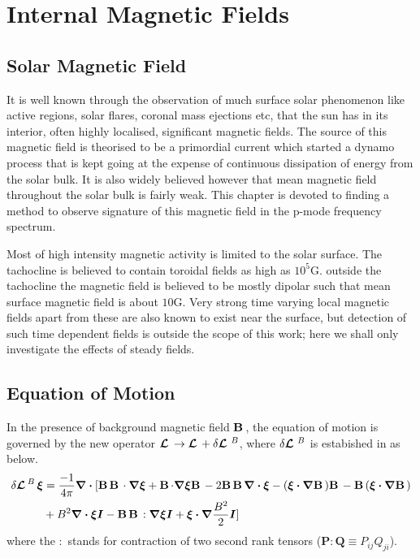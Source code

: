 \chapter{Internal Magnetic Fields}

\section{Solar Magnetic Field}\label{mag_intro}

It is well known through the observation of much surface solar phenomenon like active regions, solar flares, coronal mass ejections etc, that the sun has in its interior, often highly localised, significant magnetic fields. The source of this magnetic field is theorised to be a primordial current which started a dynamo process that is kept going at the expense of continuous dissipation of energy from the solar bulk. It is also widely believed however that mean magnetic field throughout the solar bulk is fairly weak. This chapter is devoted to finding a method to observe signature of this magnetic field in the p-mode frequency spectrum.

Most of high intensity magnetic activity is limited to the solar surface. The tachocline is believed to contain toroidal fields as high as $10^5 \text{G}$. outside the tachocline the magnetic field is believed to be mostly dipolar such that mean surface magnetic field is about $10\text{G}$. Very strong time varying local magnetic fields apart from these are also known to exist near the surface, but detection of such time dependent fields is outside the scope of this work; here we shall only investigate the effects of steady fields.

\section{Equation of Motion}

In the presence of background magnetic field $\mathbf{B}\,$, the equation of motion is governed by the new operator $\bm{\mathcal{L}}\, \rightarrow \bm{\mathcal{L}}\, + \delta \bm{\mathcal{L}}\,\,^{B}$, where $\delta \bm{\mathcal{L}}\,\,^B$ is estabished in \cite{hanasoge17} as below.
\begin{align}
    \delta \bm{\mathcal{L}}\,^{B}\, \boldsymbol{\xi} &= \frac{-1}{4\pi}\boldsymbol{\nabla \cdot} [\mathbf{B}\,\mathbf{B}\,\cdot \boldsymbol{\nabla} \boldsymbol{\xi} + \mathbf{B}\, {\cdot} \boldsymbol{\nabla}\boldsymbol{\xi}\mathbf{B}\, - 2 \mathbf{B}\,\mathbf{B}\,\boldsymbol{\nabla \cdot}\boldsymbol{\xi} - (\boldsymbol{\xi \cdot \nabla} \mathbf{B}\,)\mathbf{B}\, - \mathbf{B}\,(\boldsymbol{\xi \cdot \nabla}\mathbf{B}\,)\notag
    \\& + B^2 \boldsymbol{\nabla \cdot \xi I} - \mathbf{B}\,\mathbf{B}\, :\boldsymbol{\nabla \xi I} + \boldsymbol{\xi \cdot \nabla}\frac{B^2}{2}\boldsymbol{I}] 
     \label{eqn:dLB}
\end{align}
where the $:$ stands for contraction of two second rank tensors ($\mathbf{P}:\mathbf{Q} \equiv P_{ij}Q_{ji} $).


